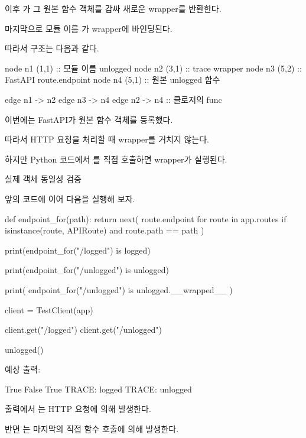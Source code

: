 이후 가 그 원본 함수 객체를 감싸 새로운 wrapper를 반환한다.

마지막으로 모듈 이름 가 wrapper에 바인딩된다.

따라서 구조는 다음과 같다.

\begin{dhkdiagram}[in=2]
node n1 (1,1) :: 모듈 이름 unlogged
node n2 (3,1) :: trace wrapper
node n3 (5,2) :: FastAPI route.endpoint
node n4 (5,1) :: 원본 unlogged 함수

edge n1 -> n2
edge n3 -> n4
edge n2 -> n4 :: 클로저의 func
\end{dhkdiagram}

이번에는 FastAPI가 원본 함수 객체를 등록했다.

따라서 HTTP 요청을 처리할 때 wrapper를 거치지 않는다.

하지만 Python 코드에서 를 직접 호출하면 wrapper가 실행된다.

\begin{dhknote}
\begin{dhksmry}[centered]
실제 객체 동일성 검증
\end{dhksmry}
\end{dhknote}

앞의 코드에 이어 다음을 실행해 보자.

\begin{dhkcode}
def endpoint_for(path):
    return next(
        route.endpoint
        for route in app.routes
        if isinstance(route, APIRoute)
        and route.path == path
    )


print(endpoint_for("/logged") is logged)

print(endpoint_for("/unlogged") is unlogged)

print(
    endpoint_for("/unlogged")
    is unlogged.__wrapped__
)


client = TestClient(app)

client.get("/logged")
client.get("/unlogged")

unlogged()
\end{dhkcode}

예상 출력:

\begin{dhkzsh}
True
False
True
TRACE: logged
TRACE: unlogged
\end{dhkzsh}

출력에서 는 HTTP 요청에 의해 발생한다.

반면 는 마지막의 직접 함수 호출에 의해 발생한다.

